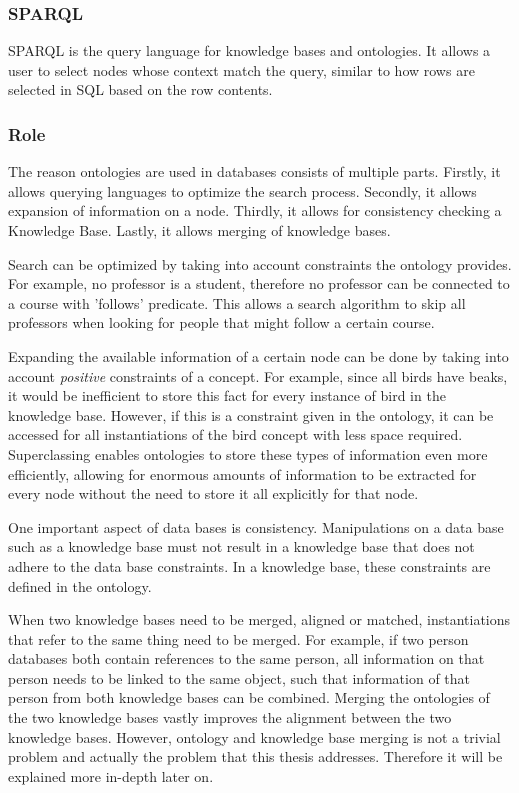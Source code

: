\documentclass{article}
\begin{document}
 \subsubsection{SPARQL}
 SPARQL is the query language for knowledge bases and ontologies. It allows a user to select nodes whose context match the query, similar to how rows are selected in SQL based on the row contents.
 \subsubsection{Role}
 The reason ontologies are used in databases consists of multiple parts. Firstly, it allows querying languages to optimize the search process. Secondly, it allows expansion of information on a node. Thirdly, it allows for consistency checking a Knowledge Base. Lastly, it allows merging of knowledge bases.
 
 Search can be optimized by taking into account constraints the ontology provides. For example, no professor is a student, therefore no professor can be connected to a course with 'follows' predicate. This allows a search algorithm to skip all professors when looking for people that might follow a certain course.
 
 Expanding the available information of a certain node can be done by taking into account \textit{positive} constraints of a concept. For example, since all birds have beaks, it would be inefficient to store this fact for every instance of bird in the knowledge base. However, if this is a constraint given in the ontology, it can be accessed for all instantiations of the bird concept with less space required. Superclassing enables ontologies to store these types of information even more efficiently, allowing for enormous amounts of information to be extracted for every node without the need to store it all explicitly for that node.
 
 One important aspect of data bases is consistency. Manipulations on a data base such as a knowledge base must not result in a knowledge base that does not adhere to the data base constraints. In a knowledge base, these constraints are defined in the ontology.
 
 When two knowledge bases need to be merged, aligned or matched, instantiations that refer to the same thing need to be merged. For example, if two person databases both contain references to the same person, all information on that person needs to be linked to the same object, such that information of that person from both knowledge bases can be combined. Merging the ontologies of the two knowledge bases vastly improves the alignment between the two knowledge bases. However, ontology and knowledge base merging is not a trivial problem and actually the problem that this thesis addresses. Therefore it will be explained more in-depth later on.
\end{document}
